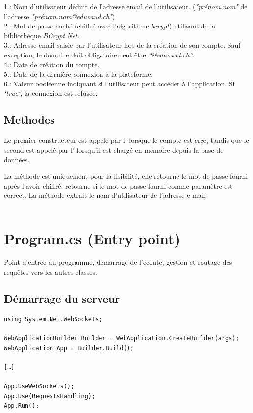 \documentclass[12pt]{report}
\begin{document}
1.: Nom d'utilisateur déduit de l'adresse email de l'utilisateur. (\textit{"prénom.nom"} de l'adresse \textit{"prénom.nom@eduvaud.ch"}) \\
2.: Mot de passe haché (chiffré avec l'algorithme \textit{bcrypt}) utilisant  de la bibliothèque \textit{BCrypt.Net}. \\
3.: Adresse email saisie par l'utilisateur lors de la création de son compte. Sauf exception, le domaine doit obligatoirement être \textit{“@eduvaud.ch”}. \\
4.: Date de création du compte. \\
5.: Date de la dernière connexion à la plateforme.\\
6.: Valeur booléenne indiquant si l'utilisateur peut accéder à l'application. Si \textit{`true`}, la connexion est refusée. \\

\subsection{Methodes}
Le premier constructeur est appelé par l’ lorsque le compte est créé, tandis que le second est appelé par l’ lorsqu'il est chargé en mémoire depuis la base de données. 

La méthode  est uniquement pour la lisibilité, elle retourne le mot de passe fourni après l'avoir chiffré.  retourne si le mot de passe fourni comme paramètre  est correct. La méthode  extrait le nom d'utilisateur de l'adresse e-mail.
\\\\

\section{Program.cs (Entry point)}

Point d'entrée du programme, démarrage de l'écoute, gestion et routage des requêtes vers les autres classes.

\subsection{Démarrage du serveur}
\begin{verbatim}
using System.Net.WebSockets;

WebApplicationBuilder Builder = WebApplication.CreateBuilder(args);
WebApplication App = Builder.Build();

[…]

App.UseWebSockets();
App.Use(RequestsHandling);
App.Run();
\end{verbatim}
\end{document}
